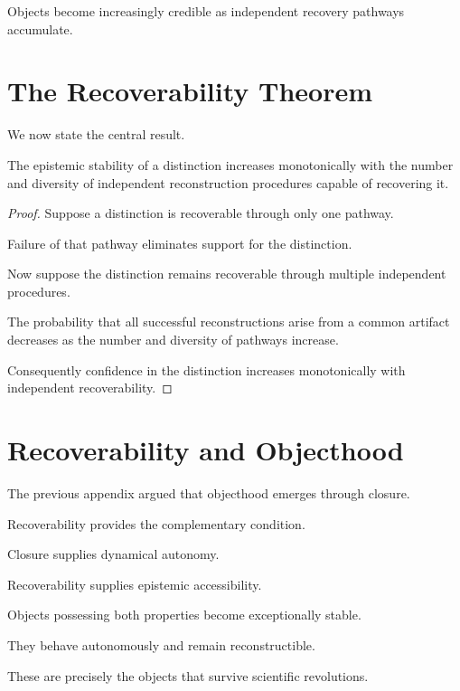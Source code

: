 \documentclass[11pt,oneside,openany]{book}
\begin{document}
Objects become increasingly credible as independent recovery pathways accumulate.

\section{The Recoverability Theorem}

We now state the central result.

\begin{theorem}

The epistemic stability of a distinction increases monotonically with the number and diversity of independent reconstruction procedures capable of recovering it.

\end{theorem}

\begin{proof}

Suppose a distinction is recoverable through only one pathway.

Failure of that pathway eliminates support for the distinction.

Now suppose the distinction remains recoverable through multiple independent procedures.

The probability that all successful reconstructions arise from a common artifact decreases as the number and diversity of pathways increase.

Consequently confidence in the distinction increases monotonically with independent recoverability.

\end{proof}

\section{Recoverability and Objecthood}

The previous appendix argued that objecthood emerges through closure.

Recoverability provides the complementary condition.

Closure supplies dynamical autonomy.

Recoverability supplies epistemic accessibility.

Objects possessing both properties become exceptionally stable.

They behave autonomously and remain reconstructible.

These are precisely the objects that survive scientific revolutions.
\end{document}

